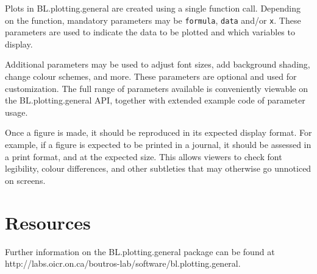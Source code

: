 \documentclass[letterpaper]{article}
\begin{document}
Plots in BL.plotting.general are created using a single function call. Depending on the function, mandatory parameters may be \verb|formula|, \verb|data| and/or \verb|x|. These parameters are used to indicate the data to be plotted and which variables to display.

Additional parameters may be used to adjust font sizes, add background shading, change colour schemes, and more. These parameters are optional and used for customization. The full range of parameters available is conveniently viewable on the BL.plotting.general API, together with extended example code of parameter usage.

Once a figure is made, it should be reproduced in its expected display format. For example, if a figure is expected to be printed in a journal, it should be assessed in a print format, and at the expected size. This allows viewers to check font legibility, colour differences, and other subtleties that may otherwise go unnoticed on screens.

\section{Resources}
Further information on the BL.plotting.general package can be found at  http://labs.oicr.on.ca/boutros-lab/software/bl.plotting.general.
\end{document}
